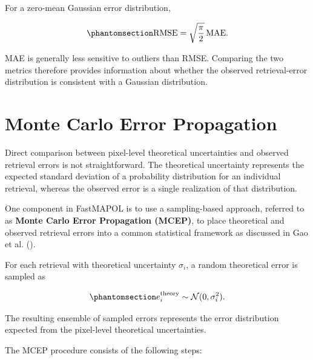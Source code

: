 \documentclass[
  11pt,
  letterpaper,
]{scrreprt}
\begin{document}
For a zero-mean Gaussian error distribution,

\begin{equation}\phantomsection\label{eq-uq-rmse-mae}{
\mathrm{RMSE}
=
\sqrt{\frac{\pi}{2}}
\,\mathrm{MAE}.
}\end{equation}

MAE is generally less sensitive to outliers than RMSE. Comparing the two
metrics therefore provides information about whether the observed
retrieval-error distribution is consistent with a Gaussian distribution.

\section{Monte Carlo Error
Propagation}\label{monte-carlo-error-propagation}

Direct comparison between pixel-level theoretical uncertainties and
observed retrieval errors is not straightforward. The theoretical
uncertainty represents the expected standard deviation of a probability
distribution for an individual retrieval, whereas the observed error is
a single realization of that distribution.

One component in FastMAPOL is to use a sampling-based approach, referred
to as \textbf{Monte Carlo Error Propagation (MCEP)}, to place
theoretical and observed retrieval errors into a common statistical
framework as discussed in Gao et al. ().

For each retrieval with theoretical uncertainty \(\sigma_i\), a random
theoretical error is sampled as

\begin{equation}\phantomsection\label{eq-uq-mcep}{
e_i^{\mathrm{theory}}
\sim
\mathcal{N}(0,\sigma_i^2).
}\end{equation}

The resulting ensemble of sampled errors represents the error
distribution expected from the pixel-level theoretical uncertainties.

The MCEP procedure consists of the following steps:
\end{document}
